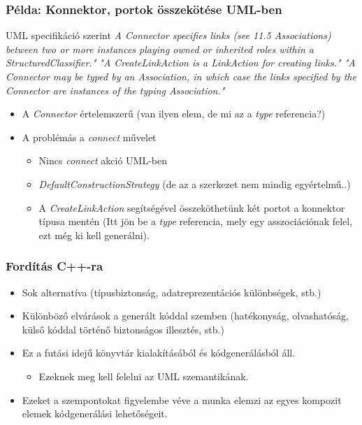 \documentclass[11pt]{beamer}
\begin{document}
\begin{frame}

	\frametitle{Példa: Konnektor, portok összekötése UML-ben}
	\begin{block}{UML specifikáció szerint}
	\textit{A Connector specifies links (see 11.5 Associations) between two or more instances playing owned or inherited roles within a StructuredClassifier." "A CreateLinkAction is a LinkAction for creating links." "A Connector may be typed by an Association, in which case the links specified by the Connector are instances of the typing Association."}
	\end{block}
	\begin{itemize}
	\item A \textit{Connector} értelemszerű (van ilyen elem, de mi az a \textit{type} referencia?)
	\item A problémás a \textit{connect} művelet
		\begin{itemize}
		\item Nincs \textit{connect} akció UML-ben
		\item \textit{DefaultConstructionStrategy}  (de az a szerkezet nem mindig egyértelmű..)
		\item A \textit{CreateLinkAction} segítségével összeköthetünk két portot a konnektor típusa mentén (Itt jön be a \textit{type} referencia, mely egy asszociációnak felel, ezt még ki kell generálni).
		\end{itemize}
	\end{itemize}
\end{frame}


\begin{frame}[fragile]	
	\frametitle{Fordítás C++-ra}	
	\begin{itemize}
	\item Sok alternatíva (típusbiztonság, adatreprezentációs különbségek, stb.)
	\item Különböző elvárások a generált kóddal szemben (hatékonyság, olvashatóság, külső kóddal történő biztonságos illesztés, stb.)
	\item Ez a futási idejű könyvtár kialakításából és kódgenerálásból áll.
		\begin{itemize}
		\item Ezeknek meg kell felelni az UML szemantikának.
		\end{itemize}
	\item Ezeket a szempontokat figyelembe véve a munka elemzi az egyes kompozit elemek  kódgenerálási lehetőségeit.
	\end{itemize}
	
\end{frame}
\end{document}
